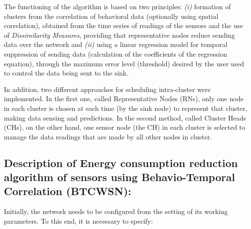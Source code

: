 \documentclass[conference]{IEEEtran}
\begin{document}
The functioning of the algorithm is based on two principles: {\it (i)} formation
of clusters from the correlation of behavioral data (optionally using spatial
correlation), obtained from the time series of readings of the sensors and the
use of \textit{Dissimilarity Measures}, providing that representative nodes
reduce sending data over the network and {\it (ii)} using a linear regression
model for temporal suppression of sending data (calculation of the coefficients
of the regression equation), through the maximum error level (threshold) desired
by the user used to control the data being sent to the sink.

In addition, two different approaches for scheduling intra-cluster were
implemented. In the first one, called Representative Nodes (RNs), only one node
in each cluster is chosen at each time (by the sink node) to represent that
cluster, making data sensing and predictions. In the second method, called
Cluster Heads (CHs), on the other hand, one sensor node (the CH) in each cluster
is selected to manage the data readings that are made by all other nodes in
cluster.

\subsection{Description of Energy consumption reduction algorithm of sensors using 
Behavio-Temporal Correlation (BTCWSN):}

Initially, the network needs to be configured from the setting of its working
parameters. To this end, it is necessary to specify:
\end{document}
